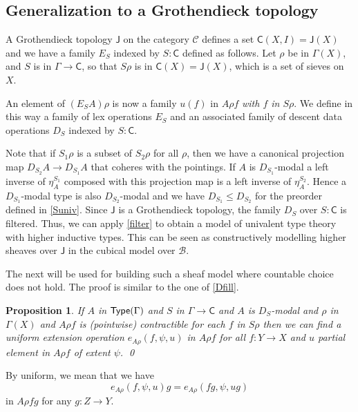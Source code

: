 \documentclass[10pt,a4paper,draft]{article}
\def\Type{\hbox{\sf Type}}
\newcommand{\JJ}{\mathsf{J}}
\newcommand{\Cov}{\mathsf{C}}%
\newcommand{\CC}{{\mathcal C}}
\newcommand{\BB}{\mathcal{B}}
\newcommand{\D}{D}              %
\newcommand{\E}{E}
\renewcommand{\~}{\widetilde}
\newtheorem{proposition}[theorem]{Proposition}
\theoremstyle{definition}
\theoremstyle{remark} %
\begin{document}
\subsection{Generalization to a Grothendieck topology} \label{subsec:gen-grothendieck-top}

A Grothendieck topology $\JJ$ on the category $\CC$ defines
a set $\Cov(X,I) = \JJ(X)$ and we have a family
$\E_S$ indexed by $S:\Cov$ defined as follows. Let $\rho$ be in $\Gamma(X)$,
and $S$ is in $\Gamma\rightarrow\Cov$, so that
$S\rho$ is in $\Cov(X) = \JJ(X)$, which is a set of sieves on $X$.

 An element
of $(\E_SA)\rho$ is now a family $u(f)$ in $A\rho f$
{\em with $f$ in $S\rho$}.
We define in this way a family of lex operations $\E_S$
and an associated family of descent data operations $\D_S$
indexed by $S:\Cov$.

Note that if $S_1\rho$ is a subset of $S_2\rho$ for all $\rho$,
then we have a canonical projection map $\D_{S_2}A\rightarrow \D_{S_1}A$ that coheres with the pointings.
If $A$ is $\D_{S_1}$\hyp{}modal a left inverse of $\eta^{S_1}_A$ composed with this projection
map is a left inverse of $\eta^{S_2}_A$. Hence a  $\D_{S_1}$\hyp{}modal type
is also  $\D_{S_2}$\hyp{}modal and we have $\D_{S_1}\leqslant \D_{S_2}$ for the preorder defined
in \cref{Suniv}.
Since $\JJ$ is a Grothendieck topology, the family $\D_S$ over $S : \Cov$ is filtered.
Thus, we can apply \cref{filter} to obtain a model of univalent type theory with higher inductive types.
This can be seen as constructively modelling higher sheaves over $\JJ$ in the cubical model over $\BB$.

The next  will be used for building such a sheaf model where
countable choice does not hold. The proof is similar to the one of \cref{Dfill}.

\begin{proposition}\label{Gcontr}
  If $A$ in $\Type(\Gamma)$ and $S$ in $\Gamma\rightarrow\Cov$ and $A$ is $D_S$-modal
  and $\rho$ in $\Gamma(X)$
  and $A\rho f$ is (pointwise) contractible for each $f$ in $S\rho$
  then we can find a uniform extension operation $e_{A\rho}(f,\psi,u)$ in $A\rho f$
  for all $f:Y\rightarrow X$ and $u$ partial element in $A\rho f$ of extent $\psi$.
\qed
\end{proposition}

By uniform, we mean that we have
%
\begin{equation*}
e_{A\rho}(f,\psi,u)g = e_{A\rho}(fg,\psi,ug)
\end{equation*}
%
in $A\rho fg$ for any $g:Z\rightarrow Y$.
\end{document}
